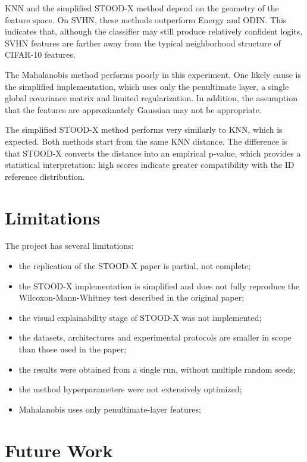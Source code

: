 \documentclass[11pt,a4paper]{article}
\begin{document}
KNN and the simplified STOOD-X method depend on the geometry of the feature space.
On SVHN, these methods outperform Energy and ODIN.
This indicates that, although the classifier may still produce relatively confident logits, SVHN features are farther away from the typical neighborhood structure of CIFAR-10 features.

The Mahalanobis method performs poorly in this experiment.
One likely cause is the simplified implementation, which uses only the penultimate layer, a single global covariance matrix and limited regularization.
In addition, the assumption that the features are approximately Gaussian may not be appropriate.

The simplified STOOD-X method performs very similarly to KNN, which is expected.
Both methods start from the same KNN distance.
The difference is that STOOD-X converts the distance into an empirical p-value, which provides a statistical interpretation: high scores indicate greater compatibility with the ID reference distribution.

\section{Limitations}

The project has several limitations:

\begin{itemize}
    \item the replication of the STOOD-X paper is partial, not complete;
    \item the STOOD-X implementation is simplified and does not fully reproduce the Wilcoxon-Mann-Whitney test described in the original paper;
    \item the visual explainability stage of STOOD-X was not implemented;
    \item the datasets, architectures and experimental protocols are smaller in scope than those used in the paper;
    \item the results were obtained from a single run, without multiple random seeds;
    \item the method hyperparameters were not extensively optimized;
    \item Mahalanobis uses only penultimate-layer features;
\end{itemize}

\section{Future Work}
\end{document}
